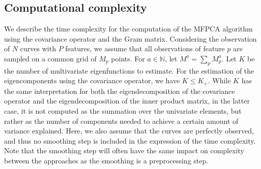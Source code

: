 \documentclass[times,sort&compress,3p]{elsarticle}
\theoremstyle{plain}%
\theoremstyle{definition}
\newcommand{\NN}{\mathbb{N}} %
\begin{document}
\subsection{Computational complexity} %
\label{sub:computational_complexity}

We describe the time complexity for the computation of the MFPCA algorithm using the covariance operator and the Gram matrix. Considering the observation of $N$ curves with $P$ features, we assume that all observations of feature $p$ are sampled on a common grid of $M_p$ points. For $a \in \NN$, let $M^a = \sum_{p} M_p^a$. Let $K$ be the number of multivariate eigenfunctions to estimate. For the estimation of the eigencomponents using the covariance operator, we have $K \leq K_+$. While $K$ has the same interpretation for both the eigendecomposition of the covariance operator and the eigendecomposition of the inner product matrix, in the latter case, it is not computed as the summation over the univariate elements, but rather as the number of components needed to achieve a certain amount of variance explained. Here, we also assume that the curves are perfectly observed, and thus no smoothing step is included in the expression of the time complexity. Note that the smoothing step will often have the same impact on complexity between the approaches as the smoothing is a preprocessing step.
\end{document}

